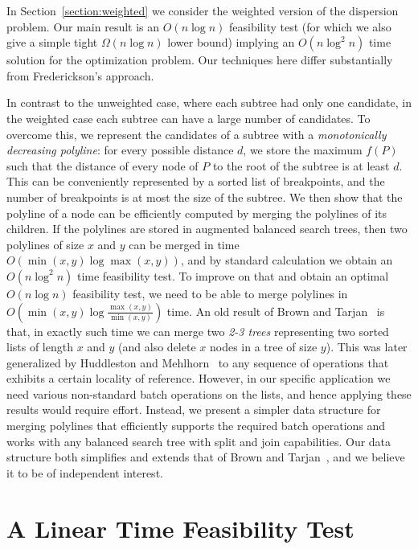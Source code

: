 \documentclass[a4paper,UKenglish]{lipics-v2016}
\theoremstyle{plain}
\newcommand{\Oh}{{O}}
\begin{document}
\medskip {}
In Section~\ref{section:weighted} we consider the weighted version of the dispersion problem. Our main result is an $O(n\log n)$ feasibility test (for which we also give a simple tight $\Omega(n\log n)$ lower bound) implying an $\Oh(n\log^2n)$ time solution for the optimization problem. Our techniques here differ substantially from Frederickson's approach.

In contrast to the unweighted case, where each subtree had only one candidate, in the weighted case each subtree can have a large number of candidates. 
  To overcome this, we represent the candidates of a subtree with a {\em monotonically decreasing polyline}:
for every possible distance $d$, we store the maximum $f(P)$ such that the distance of every node of $P$ to the root of the subtree is at least $d$.
This can be conveniently represented by a sorted list of breakpoints, and the number of breakpoints is at most
the size of the subtree. We then show that the polyline of a node can be efficiently computed by merging the polylines of its children. If the polylines
are stored in augmented balanced search trees, then two polylines of size $x$ and $y$ can be merged in time $\Oh(\min(x,y)\log\max(x,y))$,
and by standard calculation we obtain an $\Oh(n\log^{2}n)$ time feasibility test. To improve on that and obtain an optimal $\Oh(n\log n)$ feasibility test,
we need to be able to merge polylines in $\Oh(\min(x,y)\log\frac{\max(x,y)}{\min(x,y)})$ time. 
An old result of Brown and Tarjan~\cite{Brown1980} is that, in exactly such time we can merge two {\em 2-3 trees} representing two sorted lists of length $x$ and $y$ (and also delete $x$ nodes in a tree of size $y$). This was later generalized by Huddleston and
Mehlhorn~\cite{huddlestonM82} to any sequence of operations that exhibits a certain locality of reference. However, in our specific
application we need various non-standard batch operations on the lists, and hence applying these results would require effort.
Instead, we present a simpler data structure for merging polylines that efficiently supports the required batch operations and works with %
any balanced search tree with split and join capabilities. Our data structure both simplifies and extends that of Brown and Tarjan~\cite{Brown1980}, and we believe it to be of independent interest. 


\section{A Linear Time Feasibility Test}
\label{linear F.T.}
\end{document}
